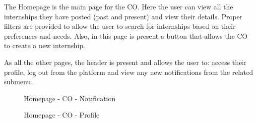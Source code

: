 \par The Homepage is the main page for the CO. Here the user can view all the internships they have posted (past and
present) and view their details. Proper filters are provided to allow the user to search for internships based on
their preferences and needs. Also, in this page is present a button that allows the CO to create a new internship.

\par As all the other pages, the header is present and allows the user to: access their profile, log out from the
platform and view any new notifications from the related submenu.

\begin{figure}[H]
    \centering
    \caption{Homepage - CO - Notification}
    \label{fig:homepage-co-notification}
\end{figure}

\begin{figure}[H]
    \centering
    \caption{Homepage - CO - Profile}
    \label{fig:homepage-co-profile}
\end{figure}

